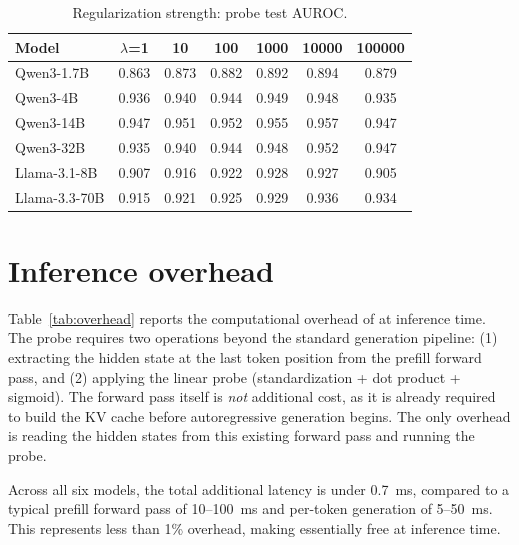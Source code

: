 \begin{table}[H]
\caption{Regularization strength: probe test AUROC.}
\label{tab:abl_reg}
\centering
\small
\begin{tabular}{lcccccc}
\toprule
Model & $\lambda$=1 & 10 & 100 & 1000 & 10000 & 100000 \\
\midrule
Qwen3-1.7B & 0.863 & 0.873 & 0.882 & 0.892 & 0.894 & 0.879 \\
Qwen3-4B   & 0.936 & 0.940 & 0.944 & 0.949 & 0.948 & 0.935 \\
Qwen3-14B  & 0.947 & 0.951 & 0.952 & 0.955 & 0.957 & 0.947 \\
Qwen3-32B     & 0.935 & 0.940 & 0.944 & 0.948 & 0.952 & 0.947 \\
Llama-3.1-8B  & 0.907 & 0.916 & 0.922 & 0.928 & 0.927 & 0.905 \\
Llama-3.3-70B & 0.915 & 0.921 & 0.925 & 0.929 & 0.936 & 0.934 \\
\bottomrule
\end{tabular}
\end{table}

\newpage
\section{Inference overhead}
\label{app:overhead}

Table~\ref{tab:overhead} reports the computational overhead of \method{} at inference time. The probe requires two operations beyond the standard generation pipeline: (1) extracting the hidden state at the last token position from the prefill forward pass, and (2) applying the linear probe (standardization + dot product + sigmoid). The forward pass itself is \emph{not} additional cost, as it is already required to build the KV cache before autoregressive generation begins. The only overhead is reading the hidden states from this existing forward pass and running the probe.

Across all six models, the total additional latency is under 0.7~ms, compared to a typical prefill forward pass of 10--100~ms and per-token generation of 5--50~ms. This represents less than 1\% overhead, making \method{} essentially free at inference time.

